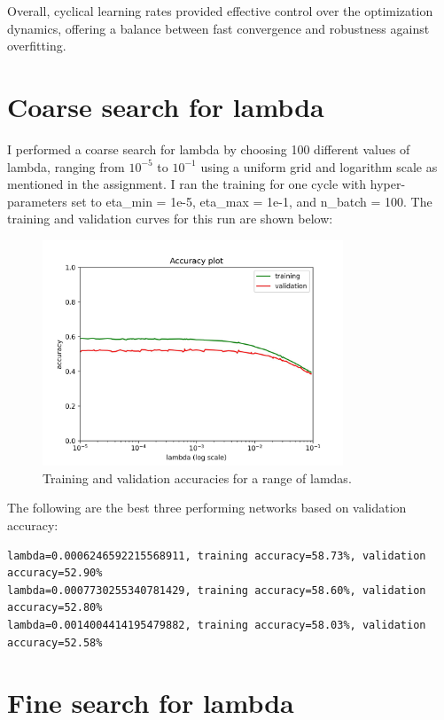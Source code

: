 \documentclass[11pt]{article}
\begin{document}
Overall, cyclical learning rates provided effective control over the optimization dynamics, offering a balance between fast convergence and robustness against overfitting.

\section*{Coarse search for lambda}

I performed a coarse search for lambda by choosing 100 different values of lambda, ranging from $10^{-5}$ to $10^{-1}$ using a uniform grid and logarithm scale as mentioned in the assignment.
I ran the training for one cycle with hyper-parameters set to eta\_min = 1e-5, eta\_max = 1e-1, and n\_batch = 100. 
The training and validation curves for this run are shown below:
\begin{figure}[H]
    \centering
    \includegraphics[width=0.8\textwidth]{lambda_accuracies.jpg}
    \caption{Training and validation accuracies for a range of lamdas.}
    \label{fig:coarse_search_curves}
\end{figure}

The following are the best three performing networks based on validation accuracy:
\begin{lstlisting}[caption={Coarse search for lambda}, label={lst:coarse_search}]
lambda=0.0006246592215568911, training accuracy=58.73%, validation accuracy=52.90%
lambda=0.0007730255340781429, training accuracy=58.60%, validation accuracy=52.80%
lambda=0.0014004414195479882, training accuracy=58.03%, validation accuracy=52.58%
\end{lstlisting}

\section*{Fine search for lambda}
\end{document}
